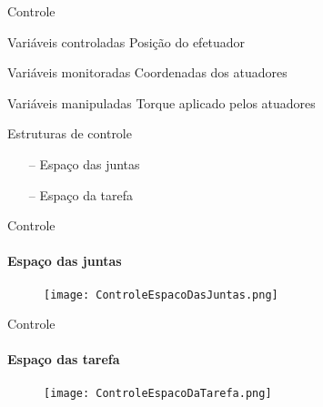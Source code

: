 \documentclass[25pt,landscape]{beamer}
\begin{document}
\begin{frame}{Controle}
    \pause
    \begin{block}{Vari\'aveis controladas}
    	Posi\c{c}\~ao do efetuador
    \end{block}
    \pause
    \begin{block}{Vari\'aveis monitoradas}
    	Coordenadas dos atuadores
    \end{block}
    \pause
    \begin{block}{Vari\'aveis manipuladas}
    	Torque aplicado pelos atuadores
    \end{block}
	\pause
   	\begin{block}{Estruturas de controle}
    	\begin{itemize}
    		\item[--] Espa\c{c}o das juntas
    		\item[--] Espa\c{c}o da tarefa
    	\end{itemize}
    \end{block}
\end{frame}

\begin{frame}{Controle}
    \framesubtitle{Espa\c{c}o das juntas}
    \begin{figure}[!h]
        \centering
        \texttt{[image: ControleEspacoDasJuntas.png]}
    \end{figure}  
\end{frame}

\begin{frame}{Controle}
    \framesubtitle{Espa\c{c}o das tarefa}
    \begin{figure}[!h]
        \centering
        \texttt{[image: ControleEspacoDaTarefa.png]}
    \end{figure}  
\end{frame}
\end{document}
